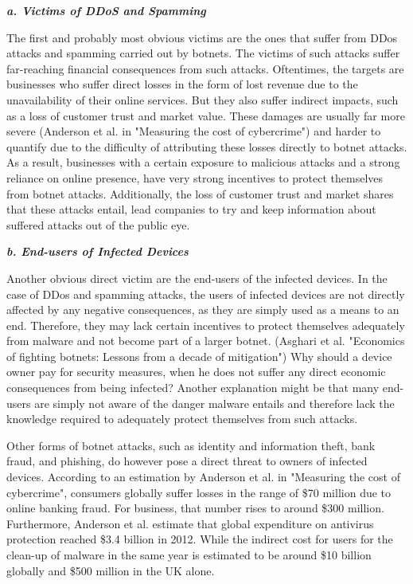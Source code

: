 			\textbf{\textit{a. Victims of DDoS and Spamming}}
			
			The first and probably most obvious victims are the ones that suffer from DDos attacks and spamming carried out by botnets. The victims of such attacks suffer far-reaching financial consequences from such attacks. Oftentimes, the targets are businesses who suffer direct losses in the form of lost revenue due to the unavailability of their online services. But they also suffer indirect impacts, such as a loss of customer trust and market value. These damages are usually far more severe (Anderson et al. in "Measuring the cost of cybercrime") and harder to quantify due to the difficulty of attributing these losses directly to botnet attacks. As a result, businesses with a certain exposure to malicious attacks and a strong reliance on online presence, have very strong incentives to protect themselves from botnet attacks. Additionally, the loss of customer trust and market shares that these attacks entail, lead companies to try and keep information about suffered attacks out of the public eye.

			\textbf{\textit{b. End-users of Infected Devices}}
			
			Another obvious direct victim are the end-users of the infected devices. In the case of DDos and spamming attacks, the users of infected devices are not directly affected by any negative consequences, as they are simply used as a means to an end. Therefore, they may lack certain incentives to protect themselves adequately from malware and not become part of a larger botnet. (Asghari et al. "Economics of fighting botnets: Lessons from a decade of mitigation") Why should a device owner pay for security measures, when he does not suffer any direct economic consequences from being infected? Another explanation might be that many end-users are simply not aware of the danger malware entails and therefore lack the knowledge required to adequately protect themselves from such attacks.

Other forms of botnet attacks, such as identity and information theft, bank fraud, and phishing, do however pose a direct threat to owners of infected devices. According to an estimation by Anderson et al. in "Measuring the cost of cybercrime", consumers globally suffer losses in the range of \$70 million due to online banking fraud. For business, that number rises to around \$300 million. Furthermore, Anderson et al. estimate that global expenditure on antivirus protection reached \$3.4 billion in 2012. While the indirect cost for users for the clean-up of malware in the same year is estimated to be around \$10 billion globally and \$500 million in the UK alone.

